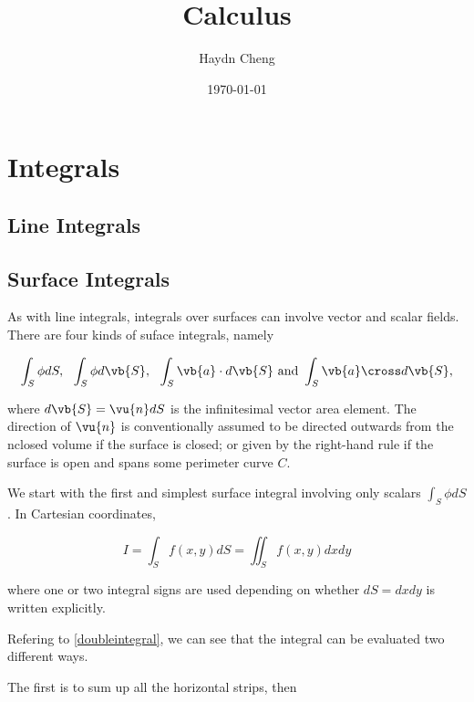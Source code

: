 \documentclass[english,a4paper,12pt]{report}
\title{Calculus}
\author{Haydn Cheng}
\date{\today}
\begin{document}
\maketitle
\tableofcontents
    
\chapter{Integrals}

\section{Line Integrals}



\section{Surface Integrals}

As with line integrals, integrals over surfaces can involve vector and scalar fields. There are four kinds of suface integrals, namely 

\begin{equation}
    \int_{S}^{} \phi dS, ~~ \int_{S}^{} \phi d\vb{S} , ~~ \int_{S}^{} \vb{a} \cdot d\vb{S} \text { and } \int_{S}^{} \vb{a} \cross d\vb{S},    
\end{equation}

where \(d\vb{S} = \vu{n} dS\) is the infinitesimal vector area element. The direction of \(\vu{n} \) is conventionally assumed to be directed outwards from the nclosed volume if the surface is closed; or given by the right-hand rule if the surface is open and spans some perimeter curve \(C\). 

We start with the first and simplest surface integral involving only scalars \(\int_{S}^{} \phi dS\). In Cartesian coordinates, 

\begin{equation}
    I = \int_{S}^{} f(x,y) dS = \iint_{S}^{} f(x,y) dx dy  
\end{equation}

where one or two integral signs are used depending on whether \(dS = dx dy \) is written explicitly.  

Refering to \cref{doubleintegral}, we can see that the integral can be evaluated two different ways. 


The first is to sum up all the horizontal strips, then 
\end{document}
